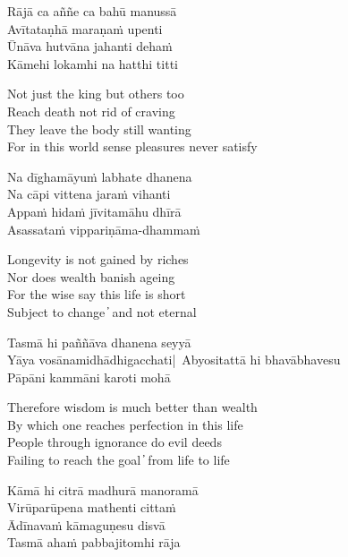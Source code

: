\begin{twochants}
  Rājā ca aññe ca bahū manussā\\
  Avītataṇhā maraṇaṁ upenti\\
  Ūnāva hutvāna jahanti dehaṁ\\
  Kāmehi lokamhi na hatthi titti
\end{twochants}

\begin{english}
  Not just the king but others too\\
  Reach death not rid of craving\\
  They leave the body still wanting\\
  For in this world sense pleasures never satisfy
\end{english}

\begin{twochants}
  Na dīghamāyuṁ labhate dhanena\\
  Na cāpi vittena jaraṁ vihanti\\
  Appaṁ hidaṁ jīvitamāhu dhīrā\\
  Asassataṁ vippariṇāma-dhammaṁ
\end{twochants}

\begin{english}
  Longevity is not gained by riches\\
  Nor does wealth banish ageing\\
  For the wise say this life is short\\
  Subject to change  ̓  and not eternal
\end{english}

\begin{twochants}
  Tasmā hi paññāva dhanena seyyā\\
  Yāya vosānamidhādhigacchati|\
  Abyositattā hi bhavābhavesu\\
  Pāpāni kammāni karoti mohā
\end{twochants}

\begin{english}
  Therefore wisdom is much better than wealth\\
  By which one reaches perfection in this life\\
  People through ignorance do evil deeds\\
  Failing to reach the goal  ̓  from life to life
\end{english}

\begin{twochants}
  Kāmā hi citrā madhurā manoramā\\
  Virūparūpena mathenti cittaṁ\\
  Ādīnavaṁ kāmaguṇesu disvā\\
  Tasmā ahaṁ pabbajitomhi rāja
\end{twochants}

